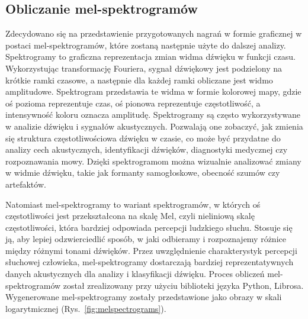 \subsection{Obliczanie mel-spektrogramów}
\label{subsec:melspectrogram}

Zdecydowano się na przedstawienie przygotowanych nagrań w formie graficznej w postaci mel-spektrogramów, które zostaną następnie użyte do dalszej analizy.
Spektrogramy to graficzna reprezentacja zmian widma dźwięku w funkcji czasu.
Wykorzystując transformację Fouriera, sygnał dźwiękowy jest podzielony na krótkie ramki czasowe, a następnie dla każdej ramki obliczane jest widmo amplitudowe.
Spektrogram przedstawia te widma w formie kolorowej mapy, gdzie oś pozioma reprezentuje czas, oś pionowa reprezentuje częstotliwość, a intensywność koloru oznacza amplitudę.
Spektrogramy są często wykorzystywane w analizie dźwięku i sygnałów akustycznych.
Pozwalają one zobaczyć, jak zmienia się struktura częstotliwościowa dźwięku w czasie, co może być przydatne do analizy cech akustycznych, identyfikacji dźwięków, diagnostyki medycznej czy rozpoznawania mowy.
Dzięki spektrogramom można wizualnie analizować zmiany w widmie dźwięku, takie jak formanty samogłoskowe, obecność szumów czy artefaktów.

Natomiast mel-spektrogramy to wariant spektrogramów, w których oś częstotliwości jest przekształcona na skalę Mel, czyli nieliniową skalę częstotliwości, która bardziej odpowiada percepcji ludzkiego słuchu.
Stosuje się ją, aby lepiej odzwierciedlić sposób, w jaki odbieramy i rozpoznajemy różnice między różnymi tonami dźwięków.
Przez uwzględnienie charakterystyk percepcji słuchowej człowieka, mel-spektrogramy dostarczają bardziej reprezentatywnych danych akustycznych dla analizy i klasyfikacji dźwięku.
Proces obliczeń mel-spektrogramów został zrealizowany przy użyciu biblioteki języka Python, Librosa.
Wygenerowane mel-spektrogramy zostały przedstawione jako obrazy w skali logarytmicznej (Rys.~\ref{fig:melspectrograms}).

